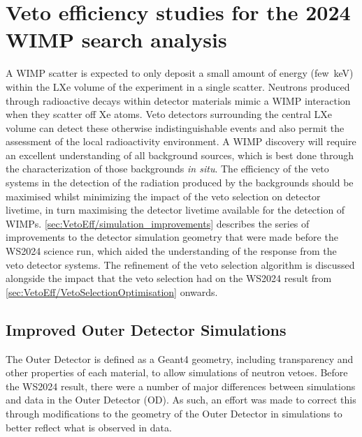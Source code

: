 \chapter{Veto efficiency studies for the 2024 WIMP search analysis}\label{chap:VetoEfficiency}
A WIMP scatter is expected to only deposit a small amount of energy (few~keV) within the LXe volume of the experiment in a single scatter. 
Neutrons produced through radioactive decays within detector materials mimic a WIMP interaction when they scatter off Xe atoms. Veto detectors surrounding the central LXe volume can detect these otherwise indistinguishable events and also permit the assessment of the local radioactivity environment. A WIMP discovery will require an excellent understanding of all background sources, which is best done through the characterization of those backgrounds \textit{in situ}. The efficiency of the veto systems in the detection of the radiation produced by the backgrounds should be maximised whilst minimizing the impact of the veto selection on detector livetime, in turn maximising the detector livetime available for the detection of WIMPs. \autoref{sec:VetoEff/simulation_improvements} describes the series of improvements to the detector simulation geometry that were made before the WS2024 science run, which aided the understanding of the response from the veto detector systems. The refinement of the veto selection algorithm is discussed alongside the impact that the veto selection had on the WS2024 result from \autoref{sec:VetoEff/VetoSelectionOptimisation} onwards.

\section{Improved Outer Detector Simulations}\label{sec:VetoEff/simulation_improvements}
The Outer Detector is defined as a Geant4 geometry, including transparency and other properties of each material, to allow simulations of neutron vetoes. 
Before the WS2024 result, there were a number of major differences between simulations and data in the Outer Detector (OD). As such, an effort was made to correct this through modifications to the geometry of the Outer Detector in simulations to better reflect what is observed in data.

